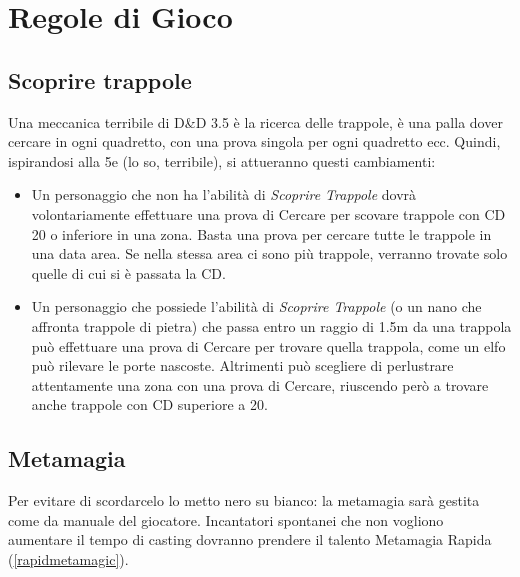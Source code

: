 \documentclass[a4paper]{report}
\begin{document}
\chapter{Regole di Gioco}
\begin{multicols}{2}

\section{Scoprire trappole}
Una meccanica terribile di D\&D 3.5 è la ricerca delle trappole, è una palla dover cercare in ogni quadretto, con una prova singola per ogni quadretto ecc.
Quindi, ispirandosi alla 5e (lo so, terribile), si attueranno questi cambiamenti:
\begin{itemize}
	\item Un personaggio che non ha l'abilità di \textit{Scoprire Trappole} dovrà volontariamente effettuare una prova di Cercare per scovare trappole con CD 20 o inferiore in una zona. Basta una prova per cercare tutte le trappole in una data area. Se nella stessa area ci sono più trappole, verranno trovate solo quelle di cui si è passata la CD.
	\item Un personaggio che possiede l'abilità di \textit{Scoprire Trappole} (o un nano che affronta trappole di pietra) che passa entro un raggio di 1.5m da una trappola può effettuare una prova di Cercare per trovare quella trappola, come un elfo può rilevare le porte nascoste. Altrimenti può scegliere di perlustrare attentamente una zona con una prova di Cercare, riuscendo però a trovare anche trappole con CD superiore a 20.
\end{itemize}

\section{Metamagia}
Per evitare di scordarcelo lo metto nero su bianco: la metamagia sarà gestita come da manuale del giocatore. Incantatori spontanei che non vogliono aumentare il tempo di casting dovranno prendere il talento Metamagia Rapida (\ref{rapidmetamagic}).

\end{multicols}
\end{document}
